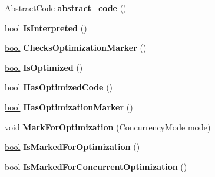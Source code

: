 \begin{DoxyCompactItemize}
\item 
\mbox{\label{classv8_1_1internal_1_1JSFunction_a14037a3029dffeb2083aed8360b5da60}} 
\mbox{\hyperlink{classv8_1_1internal_1_1AbstractCode}{Abstract\+Code}} {\bfseries abstract\+\_\+code} ()
\item 
\mbox{\label{classv8_1_1internal_1_1JSFunction_a080bbfb82ff8302c9e3678e364896490}} 
\mbox{\hyperlink{classbool}{bool}} {\bfseries Is\+Interpreted} ()
\item 
\mbox{\label{classv8_1_1internal_1_1JSFunction_a817e69363723a52a25f9a3fc3a218086}} 
\mbox{\hyperlink{classbool}{bool}} {\bfseries Checks\+Optimization\+Marker} ()
\item 
\mbox{\label{classv8_1_1internal_1_1JSFunction_a434908dc099f35034a61d708f8b73883}} 
\mbox{\hyperlink{classbool}{bool}} {\bfseries Is\+Optimized} ()
\item 
\mbox{\label{classv8_1_1internal_1_1JSFunction_a58c0ea0a802504e26a27a230de028fc6}} 
\mbox{\hyperlink{classbool}{bool}} {\bfseries Has\+Optimized\+Code} ()
\item 
\mbox{\label{classv8_1_1internal_1_1JSFunction_a26f033e6b8cb1afc4c8012a4aad51955}} 
\mbox{\hyperlink{classbool}{bool}} {\bfseries Has\+Optimization\+Marker} ()
\item 
\mbox{\label{classv8_1_1internal_1_1JSFunction_aa3fd3fbb58fbd89ba97193e5f3a262cd}} 
void {\bfseries Mark\+For\+Optimization} (Concurrency\+Mode mode)
\item 
\mbox{\label{classv8_1_1internal_1_1JSFunction_a9cd8882830e05be8b2b8adaefddbe339}} 
\mbox{\hyperlink{classbool}{bool}} {\bfseries Is\+Marked\+For\+Optimization} ()
\item 
\mbox{\label{classv8_1_1internal_1_1JSFunction_adbda5c4747be6da2b2afc51c510ba2ae}} 
\mbox{\hyperlink{classbool}{bool}} {\bfseries Is\+Marked\+For\+Concurrent\+Optimization} ()

\end{DoxyCompactItemize}
